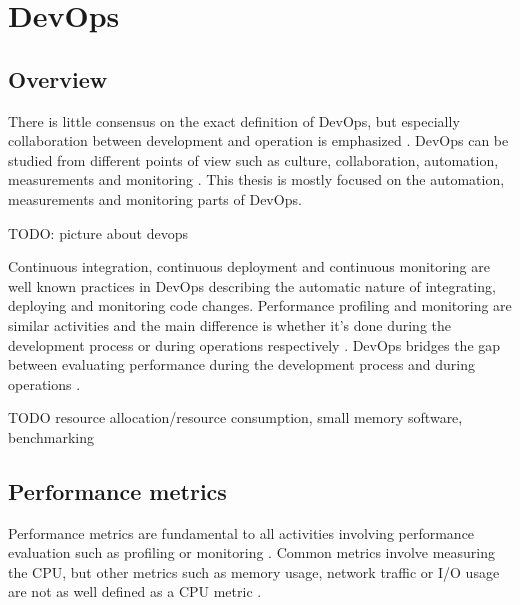 \section{DevOps}
\label{sec:devops}

\subsection{Overview}

There is little consensus on the exact definition of DevOps, but especially collaboration between development and operation is emphasized \parencite{mishraDevOpsSoftwareQuality2020,wallerIncludingPerformanceBenchmarks2015}. DevOps can be studied from different points of view such as culture, collaboration, automation, measurements and monitoring \parencite{mishraDevOpsSoftwareQuality2020, wallerIncludingPerformanceBenchmarks2015}. This thesis is mostly focused on the automation, measurements and monitoring parts of DevOps.


TODO: picture about devops

Continuous integration, continuous deployment and continuous monitoring are well known practices in DevOps \parencite{wallerIncludingPerformanceBenchmarks2015} describing the automatic nature of integrating, deploying and monitoring code changes. Performance profiling and monitoring are similar activities and the main difference is whether it's done during the development process or during operations respectively \parencite{wallerIncludingPerformanceBenchmarks2015}. DevOps bridges the gap between evaluating performance during the development process and during operations \parencite{brunnertPerformanceorientedDevOpsResearch2015}.


TODO resource allocation/resource consumption, small memory software, benchmarking

\subsection{Performance metrics}

Performance metrics are fundamental to all activities involving performance evaluation such as profiling or monitoring \parencite{brunnertPerformanceorientedDevOpsResearch2015}. Common metrics involve measuring the CPU, but other metrics such as memory usage, network traffic or I/O usage are not as well defined as a CPU metric \parencite{brunnertPerformanceorientedDevOpsResearch2015}. 


